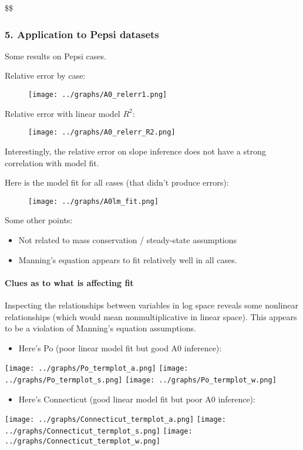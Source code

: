 \documentclass[]{article}
\providecommand{\tightlist}{%
  \setlength{\itemsep}{0pt}\setlength{\parskip}{0pt}}
\let\oldparagraph\paragraph
\renewcommand{\paragraph}[1]{\oldparagraph{#1}\mbox{}}
\begin{document}
\$\$

\subsubsection{5. Application to Pepsi
datasets}\label{application-to-pepsi-datasets}

Some results on Pepsi cases.

Relative error by case:

\begin{figure}
\centering
\texttt{[image: ../graphs/A0\_relerr1.png]}
\caption{}
\end{figure}

Relative error with linear model \(R^2\):

\begin{figure}
\centering
\texttt{[image: ../graphs/A0\_relerr\_R2.png]}
\caption{}
\end{figure}

Interestingly, the relative error on slope inference does not have a
strong correlation with model fit.

Here is the model fit for all cases (that didn't produce errors):

\begin{figure}
\centering
\texttt{[image: ../graphs/A0lm\_fit.png]}
\caption{}
\end{figure}

Some other points:

\begin{itemize}
\tightlist
\item
  Not related to mass conservation / steady-state assumptions
\item
  Manning's equation appears to fit relatively well in all cases.
\end{itemize}

\paragraph{Clues as to what is affecting
fit}\label{clues-as-to-what-is-affecting-fit}

Inspecting the relationships between variables in log space reveals some
nonlinear relationships (which would mean nonmultiplicative in linear
space). This appears to be a violation of Manning's equation
assumptions.

\begin{itemize}
\tightlist
\item
  Here's Po (poor linear model fit but good A0 inference):
\end{itemize}

\texttt{[image: ../graphs/Po\_termplot\_a.png]}
\texttt{[image: ../graphs/Po\_termplot\_s.png]}
\texttt{[image: ../graphs/Po\_termplot\_w.png]}

\begin{itemize}
\tightlist
\item
  Here's Connecticut (good linear model fit but poor A0 inference):
\end{itemize}

\texttt{[image: ../graphs/Connecticut\_termplot\_a.png]}
\texttt{[image: ../graphs/Connecticut\_termplot\_s.png]}
\texttt{[image: ../graphs/Connecticut\_termplot\_w.png]}
\end{document}
